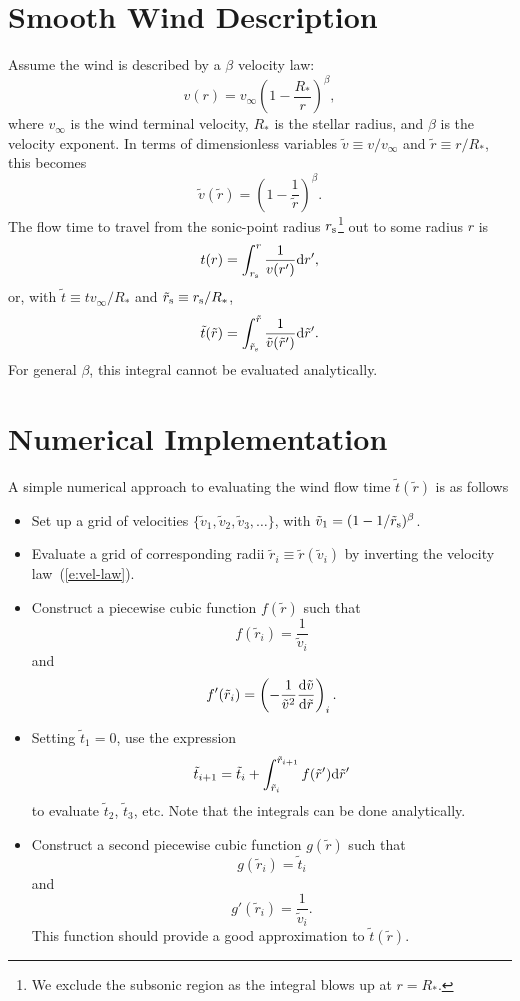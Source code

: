 \documentclass{article}
\newcommand{\vinf}{v_{\infty}}
\newcommand{\Rstar}{R_{\ast}}
\newcommand{\tr}{\tilde{r}}
\newcommand{\tv}{\tilde{v}}
\newcommand{\tti}{\tilde{t}}
\newcommand{\rsonic}{r_{\rm s}}
\newcommand{\trsonic}{\tr_{\rm s}}
\newcommand{\diff}[1]{{\rm d}#1}
\newcommand{\deriv}[2]{\frac{{\rm d}#1}{{\rm d}#2}}
\begin{document}
\section*{Smooth Wind Description}

Assume the wind is described by a $\beta$ velocity
law:
%
\begin{equation}
v(r) = \vinf \left( 1 - \frac{\Rstar}{r} \right)^{\beta},
\end{equation}
%
where $\vinf$ is the wind terminal velocity, $\Rstar$ is the stellar
radius, and $\beta$ is the velocity exponent. In terms of
dimensionless variables $\tv \equiv v/\vinf$ and $\tr \equiv r/\Rstar$,
this becomes
%
\begin{equation} \label{e:vel-law}
\tv(\tr) = \left( 1 - \frac{1}{\tr} \right)^{\beta}.
\end{equation}
%
The flow time to travel from the sonic-point radius
$\rsonic$\footnote{We exclude the subsonic region as the integral
blows up at $r=\Rstar$.} out to some radius
$r$ is
%
\begin{equation}
t(r) = \int_{\rsonic}^{r} \frac{1}{v(r')} \diff{r'},
\end{equation}
%
or, with $\tti \equiv t \vinf/\Rstar$ and $\trsonic \equiv \rsonic/\Rstar$,
%
\begin{equation} \label{e:trav-time}
\tti(\tr) = \int_{\trsonic}^{\tr} \frac{1}{\tv(\tr')} \diff{\tr'}.
\end{equation}
%
For general $\beta$, this integral cannot be evaluated analytically.

\section*{Numerical Implementation}

A simple numerical approach to evaluating the wind flow time
$\tti(\tr)$ is as follows
%
\begin{itemize}
\item Set up a grid of velocities $\{\tv_{1}, \tv_{2}, \tv_{3},
  \ldots\}$, with $\tv_{1} = (1 - 1/\trsonic)^{\beta}$.
\item Evaluate a grid of corresponding radii $\tr_{i} \equiv \tr(\tv_{i})$ by
  inverting the velocity law~(\ref{e:vel-law}).
\item Construct a piecewise cubic function $f(\tr)$ such that
  \[
  f(\tr_{i}) = \frac{1}{\tv_{i}}
  \]
  and
  \[
  f'(\tr_{i}) = \left( -\frac{1}{\tv^{2}} \deriv{\tv}{\tr} \right)_{i}.
  \]
\item Setting $\tti_{1} = 0$, use the expression
  \[
  \tti_{i+1} = \tti_{i} + \int_{\tr_{i}}^{\tr_{i+1}} f(\tr') \diff{\tr'}
  \]
  to evaluate $\tti_{2}$, $\tti_{3}$, etc. Note that the integrals can
  be done analytically.
\item Construct a second piecewise cubic function $g(\tr)$ such that
  \[
  g(\tr_{i}) = \tti_{i}
  \]
  and
  \[
  g'(\tr_{i}) = \frac{1}{\tv_{i}}.
  \]
  This function should provide a good approximation to $\tti(\tr)$.
\end{itemize}
\end{document}
